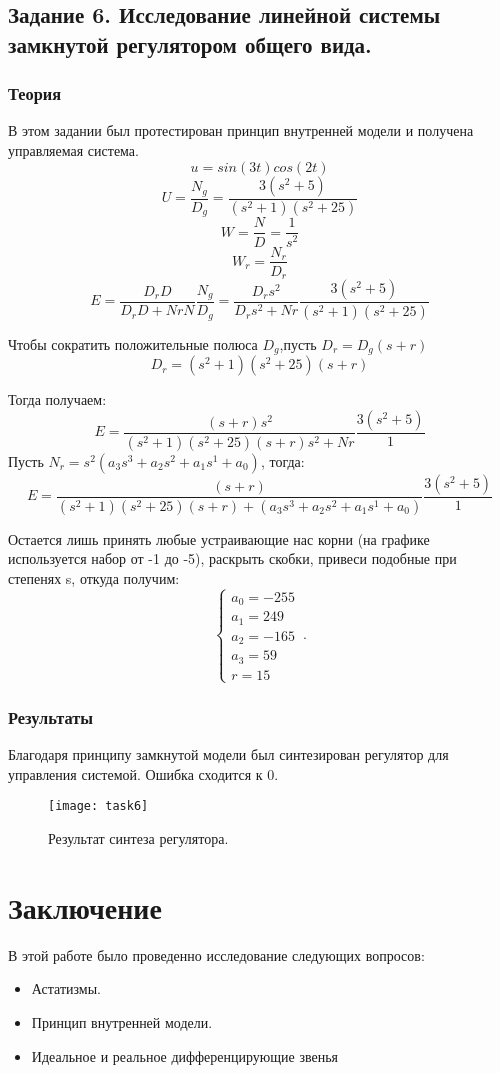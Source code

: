 \documentclass[16pt]{article}
\begin{document}
\subsection{Задание 6. Исследование линейной системы замкнутой регулятором общего вида.}

\subsubsection{Теория}
В этом задании был протестирован принцип внутренней модели и получена управляемая система.
\[u = sin(3t)cos(2t)\]
\[U = \frac{N_g}{D_g} = \frac{3(s^2+5)}{(s^2+1)(s^2+25)}\]
\[W = \frac{N}{D} = \frac{1}{s^2}\]
\[W_r = \frac{N_r}{D_r}\]
\[E = \frac{D_rD}{D_rD + NrN} \frac{N_g}{D_g} = \frac{D_rs^2}{D_rs^2 + Nr} \frac{3(s^2+5)}{(s^2+1)(s^2+25)} \]

Чтобы сократить положительные полюса \(D_g\),пусть \(D_r = D_g(s+r)\)
\[D_r = (s^2+1)(s^2+25)(s+r)\]

Тогда получаем:
\[E = \frac{(s+r)s^2}{(s^2+1)(s^2+25)(s+r)s^2 + Nr} \frac{3(s^2+5)}{1} \]
Пусть \(N_r = s^2(a_3s^3 + a_2s^2 + a_1s^1 + a_0)\), тогда:
\[E = \frac{(s+r)}{(s^2+1)(s^2+25)(s+r) + (a_3s^3 + a_2s^2 + a_1s^1 + a_0)} \frac{3(s^2+5)}{1} \]

Остается лишь принять любые устраивающие нас корни (на графике используется набор от -1 до -5), раскрыть скобки, привеси подобные при степенях s, откуда получим:
\begin{equation}
    \begin{cases}
        a_0 = -255\\
        a_1 = 249\\
        a_2 = -165\\
        a_3 = 59\\
        r = 15
    \end{cases}\,.
\end{equation}


\subsubsection{Результаты}
Благодаря принципу замкнутой модели был синтезирован регулятор для управления системой. Ошибка сходится к 0.
\begin{figure}[h!]
    \centering
    \texttt{[image: task6]}
    \caption{Результат синтеза регулятора.}
    \label{fig:fig13}
\end{figure}

\pagebreak
\pagebreak
\section{Заключение}
В этой работе было проведенно исследование следующих вопросов:
\begin{itemize}
    \item Астатизмы.
    \item Принцип внутренней модели.
    \item Идеальное и реальное дифференцирующие звенья
\end{itemize} 
\end{document}
